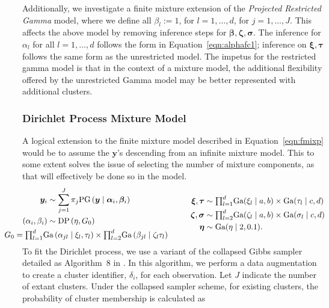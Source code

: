 Additionally, we investigate a finite mixture extension of the \emph{Projected Restricted Gamma} model,
  where we define all $\beta_l := 1$, for $l = 1,\ldots,d$, for $j = 1,\ldots,J$.  This affects the above
  model by removing inference steps for $\bm{ \beta},\bm{ \zeta},\bm{ \sigma}$.  The inference for
  $\alpha_l$ for all $l = 1,\ldots,d$ follows the form in Equation~\ref{eqn:alphafc1}; inference on
  $\bm{ \xi,\tau}$ follows the same form as the unrestricted model.  The impetus for the restricted
  gamma model is that in the context of a mixture model, the additional flexibility offered by the unrestricted Gamma model may be better represented with additional clusters.

\subsubsection{Dirichlet Process Mixture Model}
A logical extension to the finite mixture model described in Equation~\ref{eqn:fmixp} would be to assume the
  $\bm{ y}$'s descending from an infinite mixture model.  This to some extent solves the issue of
  selecting the number of mixture components, as that will effectively be done so in the model.
  \begin{equation}
    \label{eqn:infmixp}
    \begin{aligned}
      \bm{ y}_i &\sim \sum_{j = 1}^J\pi_j\text{PG}\left(\bm{ y}\mid \bm{ \alpha}_i, \bm{ \beta}_i\right)\\
      (\alpha_i,\beta_i) &\sim \text{DP}\left(\eta, G_0\right)\\
      &~\hspace{-2cm}G_0 = {\textstyle\prod}_{l = 1}^d\text{Ga}\left(\alpha_{jl}\mid\xi_{l},\tau_{l}\right)
                    \times{\textstyle\prod}_{l=2}^d\text{Ga}\left(\beta_{jl}\mid\zeta_{l}\tau_{l}\right)
    \end{aligned}
    \hspace{1cm}
    \begin{aligned}
      \bm{ \xi},\bm{ \tau} &\sim {\textstyle \prod}_{l = 1}^d \text{Ga}(\xi_l\mid a,b)\times \text{Ga}(\tau_l\mid c,d)\\
      \bm{ \zeta},\bm{\sigma} &\sim {\textstyle\prod}_{l = 2}^d\text{Ga}(\zeta_l \mid a,b)\times \text{Ga}(\sigma_l\mid c,d)\\
      \bm{ \eta} &\sim \text{Ga}(\eta \mid 2, 0.1).
    \end{aligned}
  \end{equation}
  To fit the Dirichlet process, we use a variant of the collapsed Gibbs sampler detailed as Algorithm~8 in \citet{neal2000}.  In this algorithm, we perform a data augmentation to create a cluster identifier, $\delta_i$, for each observation. Let $J$ indicate the number of extant clusters.  Under the collapsed sampler scheme, for existing clusters, the probability of cluster membership is calculated as
